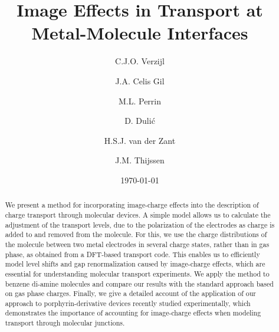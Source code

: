 \documentclass[aip,jcp,a4paper,reprint,floatfix,superscriptaddress]{revtex4-1}
\begin{document}
\title{Image Effects in Transport at Metal-Molecule Interfaces}

\author{C.J.O. Verzijl}
\author{J.A. Celis Gil}
\author{M.L. Perrin}
\author{D. Duli\'c}
\author{H.S.J. van der Zant}
\author{J.M. Thijssen}

\date{\today}





\begin{abstract}
We present a method for incorporating image-charge effects into the description of charge transport through molecular devices. A simple model allows us to calculate the adjustment of the transport levels, due to the polarization of the electrodes as charge is added to and removed from the molecule. For this, we use the charge distributions of the molecule between two metal electrodes in several charge states, rather than in gas phase, as obtained from a DFT-based transport code.
This enables us to efficiently model level shifts and gap renormalization caused by image-charge effects, which are essential for understanding molecular transport experiments. We apply the method to benzene di-amine molecules and compare our results with the standard approach based on gas phase charges. Finally, we give a detailed account of the application of our approach to porphyrin-derivative devices recently studied experimentally\cite{Perrin2013}, which demonstrates the importance of accounting for image-charge effects when modeling transport through molecular junctions.
\end{abstract}

\maketitle
\end{document}
